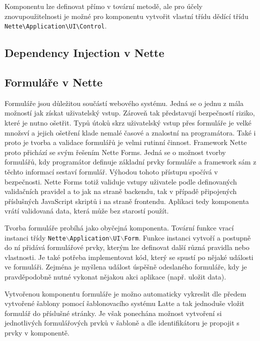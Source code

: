 \documentclass[czech,BP]{thesiskiv}
\begin{document}
		\par Komponentu lze definovat přímo v tovární metodě, ale pro účely znovupoužitelnosti je možné pro komponentu vytvořit vlastní třídu dědící třídu \texttt{Nette\textbackslash Application\textbackslash UI\textbackslash Control}.
		
		\subsection{Dependency Injection v Nette}
		
		
		\subsection{Formuláře v Nette}
		\par Formuláře jsou důležitou součástí webového systému. Jedná se o jednu z mála možností jak získat uživatelský vstup. Zároveň tak představují bezpečností riziko, které je nutno ošetřit. Typů útoků skrz uživatelský vstup přes formuláře je velké množsví a jejich ošetření klade nemalé časové a znalostní na programátora. Také i proto je tvorba a validace formulářů je velmi rutinní činnost. Framework Nette proto přichází se svým řešením Nette Forms. Jedná se o možnost tvorby formulářů, kdy programátor definuje základní prvky formuláře a framework sám z těchto informací sestaví formulář. Výhodou tohoto přístupu spočívá v bezpečnosti. Nette Forms totiž validuje vstupy uživatele podle definovaných validačních pravidel a to jak na straně backendu, tak v případě připojených příslušných JavaScript skriptů i na straně frontendu. Aplikaci tedy komponenta vrátí validovaná data, která může bez starostí použít.
		\par Tvorba formuláře probíhá jako obyčejná komponenta. Tovární funkce vrací instanci třídy \texttt{Nette$\backslash$Application$\backslash$UI$\backslash$Form}. Funkce instanci vytvoří a postupně do ní přidává formulářové prvky, kterým lze definovat další různá pravidla nebo vlastnosti. Je také potřeba implementovat kód, který se spustí po nějaké události ve formuláři. Zejména je myšlena událost úspěšně odeslaného formuláře, kdy je pravděpodobně nutné vykonat nějakou akci aplikace (např. uložit data).
		\par Vytvořenou komponentu formuláře je možno automaticky vykreslit dle předem vytvořené šablony pomocí šablonovacího systému Latte a tak jednoduše vložit formulář do příslušné stránky. Je však ponechána možnost vytvoření si jednotlivých formulářových prvků v šabloně a dle identifikátoru je propojit s prvky v komponentě.
\end{document}
